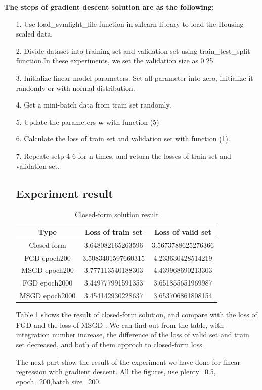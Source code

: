 \documentclass[journal, a4paper]{IEEEtran}
\begin{document}
 \textbf{The steps of gradient descent solution are as the following:}
\begin{itemize}
\item[1.] Use load\_svmlight\_file function in sklearn library to load the Housing scaled data.
\item[2.] Divide dataset into training set and validation set using train\_test\_split function.In these experiments, we set the validation size as 0.25.
\item[3.]Initialize linear model parameters. Set all parameter into zero, initialize it randomly or with normal distribution.
\item[4.] Get a mini-batch data from train set randomly.
\item[5.] Update the parameters $\boldsymbol{w}$ with function (5)
\item[6.] Calculate the loss of train set and validation set with function (1).
\item[7.] Repeate setp 4-6 for n times, and return the losses of train set and validation set.

\subsection{Experiment result}
\begin{table}[!htb]
	\begin{center}
	\caption{Closed-form solution result}
	\label{tab:closed form}
	\begin{tabular}{|c|c|c|}
		\hline
		Type &  Loss of train set & Loss of valid set\\
		\hline
		Closed-form & 3.648082165263596 &3.5673788625276366 \\
		\hline
		FGD epoch200 & 3.5083401597660315 &4.233630428514219 \\
		\hline
		MSGD epoch200 & 3.777113540188303 &4.439968690213303 \\
		\hline
FGD epoch2000 & 3.449777991591353 &3.651855651969987 \\
		\hline
		MSGD epoch2000 & 3.454142930228637 & 3.653706861808154 \\
		\hline
	\end{tabular}
	\end{center}
\end{table}

Table.1 shows the result of closed-form solution, and compare with the loss of FGD and the loss of MSGD . We can find out from the table, with integration number increase, the difference of the loss of valid set and train set decreased, and both of them approch to closed-form loss.

The next part show the result of the experiment we have done for linear regression with gradient descent. All the figures, use plenty=0.5, epoch=200,batch size=200.

\end{itemize}
\end{document}
